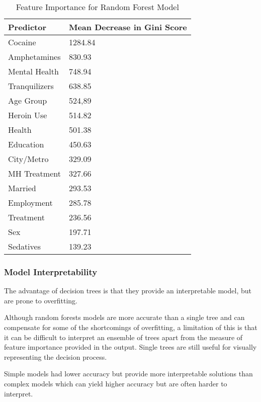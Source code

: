 \documentclass[sigconf]{acmart}
\begin{document}
\begin{table}
  \caption{Feature Importance for Random Forest Model}
  \label{tab:freq}
  \begin{tabular}{ll}
    \toprule
    Predictor&  Mean Decrease in Gini Score  \\    
    \midrule
    Cocaine       & 1284.84 \\
    Amphetamines  &  830.93 \\
    Mental Health &  748.94 \\ 
    Tranquilizers &  638.85 \\
    Age Group     &  524,89 \\
    Heroin Use    &  514.82 \\
    Health        &  501.38 \\
    Education     &  450.63 \\
    City/Metro    &  329.09 \\
    MH Treatment  &  327.66 \\
    Married       &  293.53 \\
    Employment    &  285.78 \\ 
    Treatment     &  236.56 \\
    Sex           &  197.71 \\
    Sedatives   &  139.23 \\
    \bottomrule
  \end{tabular}
\end{table}


\subsubsection{Model Interpretability}


The advantage of decision trees is that they provide an interpretable model,
but are prone to overfitting. 

Although random forests models are more accurate than a single tree and can
compensate for some of the shortcomings of overfitting, a limitation of this 
is that it can be difficult to interpret an ensemble of trees apart from the 
measure of feature importance provided in the output. Single trees are still 
useful for visually representing the decision process.

Simple models had lower accuracy but provide more interpretable solutions 
than complex models which can yield higher accuracy but are often harder 
to interpret. 
\end{document}
